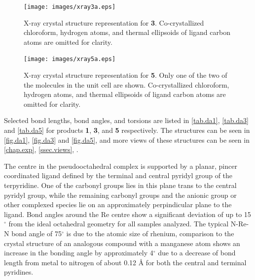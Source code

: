 \begin{figure}[!htbp]
 \begin{center}
  \texttt{[image: images/xray3a.eps]}
 \end{center}
\caption[X-ray crystal structure representation for \textbf{3}.]{X-ray crystal structure representation for \textbf{3}. Co-crystallized chloroform, hydrogen atoms, and thermal ellipsoids of ligand carbon atoms are omitted for clarity.}
\label{fig.da3}
\end{figure}

\begin{figure}[!htbp]
 \begin{center}
  \texttt{[image: images/xray5a.eps]}
 \end{center}
\caption[X-ray crystal structure representation for \textbf{5}.]{X-ray crystal structure representation for \textbf{5}. Only one of the two of the molecules in the unit cell are shown. Co-crystallized chloroform, hydrogen atoms, and thermal ellipsoids of ligand carbon atoms are omitted for clarity.}
\label{fig.da5}
\end{figure}

Selected bond lengths, bond angles, and torsions are listed in \autoref{tab.da1}, \autoref{tab.da3} and \autoref{tab.da5} for products \textbf{1}, \textbf{3}, and \textbf{5} respectively. The structures can be seen in \autoref{fig.da1}, \autoref{fig.da3} and \autoref{fig.da5}, and more views of these structures can be seen in \autoref{chap.exp}, \autoref{ssec.views}, . 

The  centre in the pseudooctahedral complex is supported by a planar, pincer coordinated ligand defined by the terminal and central pyridyl group of the terpyridine. One of the carbonyl groups lies in this plane trans to the central pyridyl group, while the remaining carbonyl groups and the anionic group or other complexed species lie on an approximately perpindicular plane to the ligand. Bond angles around the Re centre show a significant deviation of up to 15$^\circ$ from the ideal octahedral geometry for all samples analyzed. The typical N-Re-N bond angle of 75$^\circ$ is due to the atomic size of rhenium, comparison to the crystal structure of an analogous compound with a manganese atom\autocite{compain2014} shows an increase in the bonding angle by approximately 4$^\circ$ due to a decrease of bond length from metal to nitrogen of about 0.12 \r{A} for both the central and terminal pyridines. 

